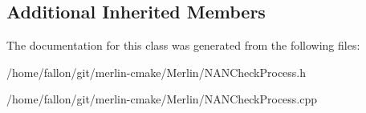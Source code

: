 \subsection*{Additional Inherited Members}


The documentation for this class was generated from the following files\+:\begin{DoxyCompactItemize}
\item 
/home/fallon/git/merlin-\/cmake/\+Merlin/N\+A\+N\+Check\+Process.\+h\item 
/home/fallon/git/merlin-\/cmake/\+Merlin/N\+A\+N\+Check\+Process.\+cpp\end{DoxyCompactItemize}
